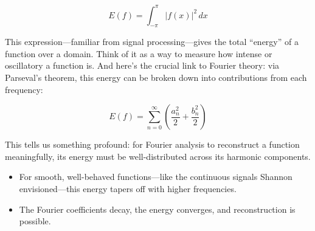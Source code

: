 \[
E(f) = \int_{-\pi}^{\pi} |f(x)|^2 \,dx
\]

This expression—familiar from signal processing—gives the total “energy” of a function over a domain. Think of it as a way to measure how intense or oscillatory a function is. And here’s the crucial link to Fourier theory: via Parseval’s theorem, this energy can be broken down into contributions from each frequency:

\[
E(f) = \sum_{n=0}^{\infty} \left( \frac{a_n^2}{2} + \frac{b_n^2}{2} \right)
\]

This tells us something profound: for Fourier analysis to reconstruct a function meaningfully, its energy must be well-distributed across its harmonic components.

\begin{itemize}
    \item For smooth, well-behaved functions—like the continuous signals Shannon envisioned—this energy tapers off with higher frequencies.
    \item The Fourier coefficients decay, the energy converges, and reconstruction is possible.
\end{itemize}

\begin{center}
\end{center}

